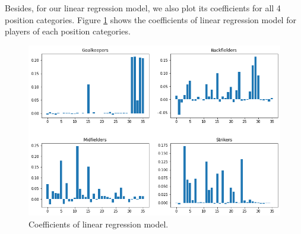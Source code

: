 \documentclass{article}
\begin{document}
Besides, for our linear regression model, we also plot its coefficients for all 4 position categories. Figure \ref{fig5} shows the coefficients of linear regression model for players of each position categories.

\begin{figure}[!htb]
	\centering
    \includegraphics[scale=0.5]{coefs.png}
    \caption{Coefficients of linear regression model.}\label{fig5}
\end{figure}

\nocite{*}


\end{document}
